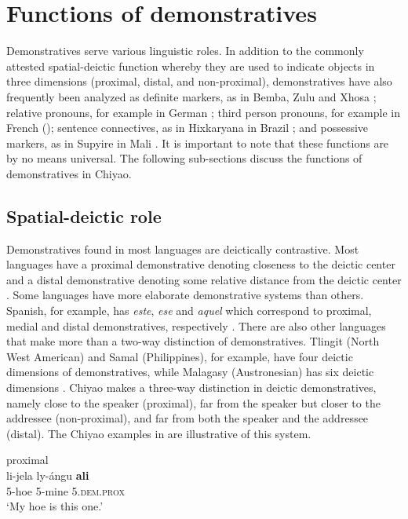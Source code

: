 \documentclass[output=paper,
            colorlinks, citecolor=brown
            ,draftmode
		  ]{langscibook}
\begin{document}
\section{Functions of demonstratives}\label{sec:taji:6}

Demonstratives serve various linguistic roles. In addition to the commonly attested spatial-deictic function whereby they are used to indicate objects in three dimensions (proximal, distal, and non-proximal), demonstratives have also frequently been analyzed as definite markers, as in Bemba, Zulu and Xhosa \citep{Greenberg1978}; relative pronouns, for example in German \citep{Lehmann1984}; third person pronouns, for example in French (\citealt{Harris1978, Lambrecht1981}); sentence connectives, as in Hixkaryana in Brazil \citep{Derbyshire1985}; and possessive markers, as in Supyire in Mali \citep{Carlson1994}. It is important to note that these functions are by no means universal. The following sub-sections discuss the functions of demonstratives in Chiyao. 

\subsection{Spatial-deictic role}\label{sec:taji:6.1}

Demonstratives found in most languages are deictically contrastive. Most languages have a proximal demonstrative denoting closeness to the deictic center and a distal demonstrative denoting some relative distance from the deictic center \citep{Amfo2007}. Some languages have more elaborate demonstrative systems than others. Spanish, for example, has \textit{este}, \textit{ese} and \textit{aquel} which correspond to proximal, medial and distal demonstratives, respectively \citep{Amfo2007}. There are also other languages that make more than a two-way distinction of demonstratives. Tlingit (North West American) and Samal (Philippines), for example, have four deictic dimensions of demonstratives, while Malagasy (Austronesian) has six deictic dimensions \citep{Levinson1983}. Chiyao makes a three-way distinction in deictic demonstratives, namely close to the speaker (proximal), far from the speaker but closer to the addressee (non-proximal), and far from both the speaker and the addressee (distal). The Chiyao examples in  are illustrative of this system.

\ea%
    \label{ex:taji:31}
    \ea\label{ex:taji:31a} proximal\\
    \gll li-jela  ly-ángu      \textbf{ali}\\
      5-hoe    5-mine      5.\textsc{dem.prox}\\
     \glt  ‘My hoe is this one.’
\end{document}
